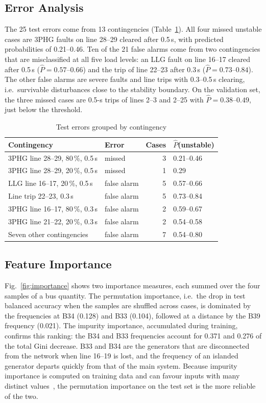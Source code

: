 \documentclass[conference]{IEEEtran}
\begin{document}
\subsection{Error Analysis}
The 25 test errors come from 13 contingencies (Table~\ref{tab:errors}). All four missed unstable cases are 3PHG faults
on line 28--29 cleared after 0.5\,s, with predicted probabilities of 0.21--0.46. Ten of the 21 false alarms come from
two contingencies that are misclassified at all five load levels: an LLG fault on line 16--17 cleared after 0.5\,s
($\hat{P} = 0.57$--$0.66$) and the trip of line 22--23 after 0.3\,s ($\hat{P} = 0.73$--$0.84$). The other false alarms are
severe faults and line trips with 0.3--0.5\,s clearing, i.e.\ survivable disturbances close to the stability
boundary. On the validation set, the three missed cases are 0.5-s trips of lines 2--3 and 2--25 with
$\hat{P} = 0.38$--$0.49$, just below the threshold.

\begin{table}[t]
\caption{Test errors grouped by contingency}
\label{tab:errors}
\centering
\setlength{\tabcolsep}{3.5pt}
\begin{tabular}{llrl}
\toprule
Contingency & Error & Cases & $\hat{P}$(unstable) \\
\midrule
3PHG line 28--29, 80\,\%, 0.5\,s & missed & 3 & 0.21--0.46 \\
3PHG line 28--29, 20\,\%, 0.5\,s & missed & 1 & 0.29 \\
LLG line 16--17, 20\,\%, 0.5\,s  & false alarm & 5 & 0.57--0.66 \\
Line trip 22--23, 0.3\,s        & false alarm & 5 & 0.73--0.84 \\
3PHG line 16--17, 80\,\%, 0.3\,s & false alarm & 2 & 0.59--0.67 \\
3PHG line 21--22, 20\,\%, 0.3\,s & false alarm & 2 & 0.54--0.58 \\
Seven other contingencies       & false alarm & 7 & 0.54--0.80 \\
\bottomrule
\end{tabular}
\end{table}

\subsection{Feature Importance}
Fig.~\ref{fig:importance} shows two importance measures, each summed over the four samples of a bus quantity. The
permutation importance, i.e.\ the drop in test balanced accuracy when the samples are shuffled across cases, is
dominated by the frequencies at B34 (0.128) and B33 (0.104), followed at a distance by the B39 frequency (0.021). The
impurity importance, accumulated during training, confirms this ranking: the B34 and B33 frequencies account for
0.371 and 0.276 of the total Gini decrease. B33 and B34 are the generators that are disconnected from the network
when line 16--19 is lost, and the frequency of an islanded generator departs quickly from that of the main system.
Because impurity importance is computed on training data and can favour inputs with many distinct
values~\cite{strobl2007}, the permutation importance on the test set is the more reliable of the two.
\end{document}
